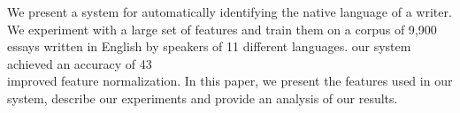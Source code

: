 We present a system for automatically identifying the native language of a writer. We experiment with a large set of features and train them on a corpus
 of 9,900 essays written in English by speakers of 11 different languages. our
 system achieved an accuracy of 43\\%
 improved feature normalization. In this paper, we present the features used in
 our system, describe our experiments and provide an analysis of our results.

